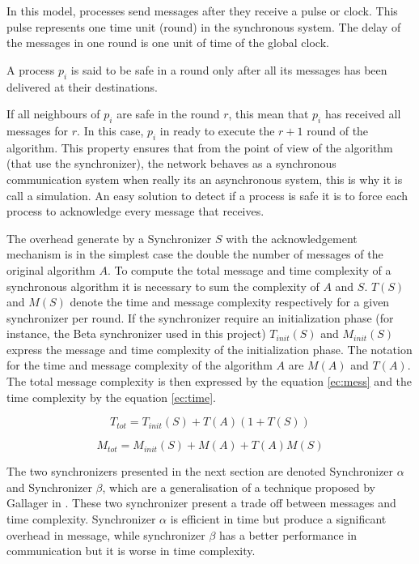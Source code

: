 In this model, processes send messages after they receive a pulse or clock. This pulse represents one time unit (round) in the synchronous system. The delay of the messages in one round is one unit of time of the global clock.

\begin{definition}
\label{def:safe}
A process $p_i$ is said to be safe in a round only after all its messages has been delivered at their destinations.
\end{definition}

If all neighbours of $p_i$ are safe in the round $r$, this mean that $p_i$ has received all messages for $r$. In this case, $p_i$ in ready to execute the $r + 1$ round of the algorithm. This property ensures that from the point of view of the algorithm (that use the synchronizer), the network behaves as a synchronous communication system when really its an asynchronous system, this is why it is call a simulation. An easy solution to detect if a process is safe it is to force each process to acknowledge every message that receives. 

The  overhead generate by a Synchronizer $S$ with the acknowledgement mechanism is in the simplest case the double the number of messages of the original algorithm $A$. To compute the total message and time complexity of a synchronous algorithm it is necessary to sum the complexity of $A$ and $S$. $T(S)$ and $M(S)$ denote the time and message complexity respectively for a given synchronizer per round. If the synchronizer require an initialization phase (for instance, the Beta synchronizer used in this project) $T_{init}(S)$ and $M_{init}(S)$ express the message and time complexity of the initialization phase. The notation for the time and message complexity of the algorithm $A$ are $M(A)$ and $T(A)$. The total message complexity is then expressed by the equation \ref{ec:mess} and the time complexity by the equation \ref{ec:time}. 


\begin{equation}
\label{ec:mess}
 T_{tot} = T_{init}(S) + T(A)(1+T(S)) 
\end{equation}

\begin{equation}
\label{ec:time}
M_{tot} = M_{init}(S) + M(A) + T(A)M(S) 
\end{equation}


The two synchronizers presented in the next section are denoted Synchronizer $\alpha$ and Synchronizer $\beta$, which are a generalisation of a technique proposed by Gallager in \cite{gallager1982distributed}. These two synchronizer present a trade off between messages and time complexity. Synchronizer $\alpha$ is efficient in time but produce a significant overhead in message, while synchronizer $\beta$ has a better performance in communication but it is worse in time complexity.  



